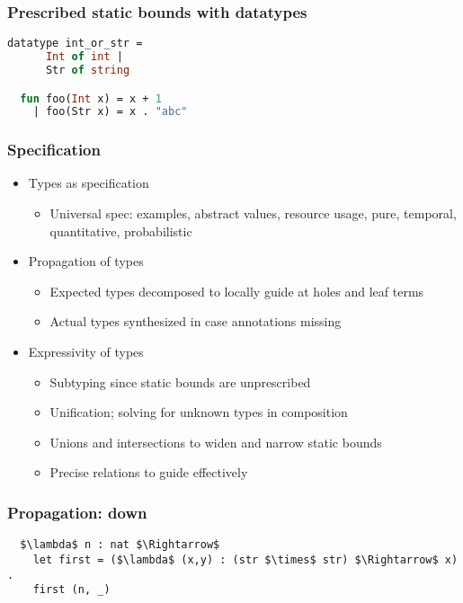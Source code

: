 \documentclass{beamer}
\begin{document}
\begin{frame}[fragile]
  \frametitle{Prescribed static bounds with datatypes}

  \begin{lstlisting}[language=ML]
  datatype int_or_str = 
      Int of int | 
      Str of string

  fun foo(Int x) = x + 1
    | foo(Str x) = x . "abc"
  \end{lstlisting}

\end{frame}

\begin{frame}[fragile]
  \frametitle{Specification}
  \begin{itemize}
  \item Types as specification 
    \begin{itemize}
    \item Universal spec: examples, abstract values, resource usage, 
      pure, temporal, quantitative, probabilistic 
    \end{itemize}
  \item Propagation of types   
    \begin{itemize}
    \item Expected types decomposed to locally guide at holes and leaf terms   
    \item Actual types synthesized in case annotations missing 
    \end{itemize}

  \item Expressivity of types    
    \begin{itemize}
    \item Subtyping since static bounds are unprescribed 
    \item Unification; solving for unknown types in composition 
    \item Unions and intersections to widen and narrow static bounds 
    \item Precise relations to guide effectively   
    \end{itemize}
  \end{itemize}
\end{frame}

\begin{frame}[fragile]
  \frametitle{Propagation: down}

  \begin{lstlisting}
  $\lambda$ n : nat $\Rightarrow$
    let first = ($\lambda$ (x,y) : (str $\times$ str) $\Rightarrow$ x) .
    first (n, _) 
  \end{lstlisting}

\end{frame}
\end{document}
